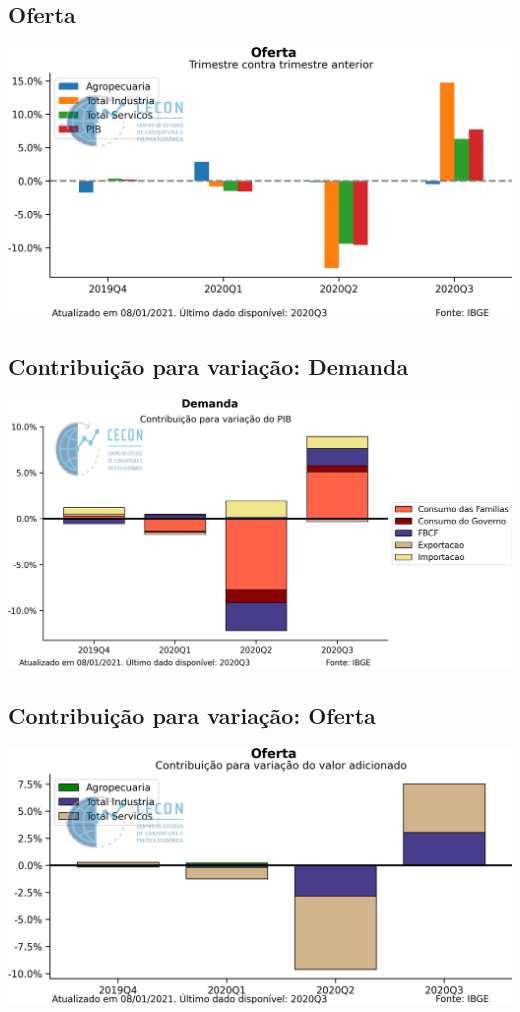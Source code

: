 \documentclass{SelfArx}
\begin{document}
\subsection*{Oferta}
\label{sec:orga6efa11}


\begin{center}
\includegraphics[width=.9\linewidth]{./figs/PIB/Oferta.png}
\end{center}


\subsection*{Contribuição para variação: Demanda}
\label{sec:org6218616}

\begin{center}
\includegraphics[width=.9\linewidth]{./figs/PIB/Contrib_Demanda.png}
\end{center}

\subsection*{Contribuição para variação: Oferta}
\label{sec:orge10c7ff}

\begin{center}
\includegraphics[width=.9\linewidth]{./figs/PIB/Contrib_Oferta.png}
\end{center}
\end{document}
